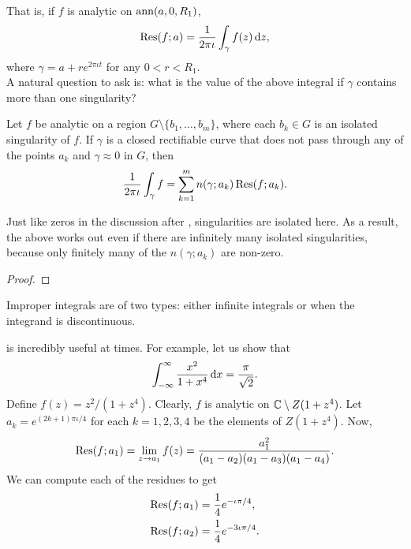 	That is, if $f$ is analytic on $\operatorname{ann}(a,0,R_1)$,
	\[ \Res(f;a) = \frac{1}{2\pi\iota} \int_{\gamma} f(z) \dif z, \]
	where $\gamma = a + re^{2\pi\iota t}$ for any $0 < r < R_1$.\\
	A natural question to ask is: what is the value of the above integral if $\gamma$ contains more than one singularity?

	\begin{ftheo}
		\label{residue theorem}
		Let $f$ be analytic on a region $G \setminus \{b_1,\ldots,b_m\}$, where each $b_k \in G$ is an isolated singularity of $f$. If $\gamma$ is a closed rectifiable curve that does not pass through any of the points $a_k$ and $\gamma \approx 0$ in $G$, then
		\[ \frac{1}{2\pi\iota} \int_{\gamma} f = \sum_{k=1}^m n(\gamma;a_k) \operatorname{Res}(f;a_k). \]
	\end{ftheo}

	Just like zeros in the discussion after , singularities are isolated here. As a result, the above works out even if there are infinitely many isolated singularities, because only finitely many of the $n(\gamma;a_k)$ are non-zero.

	\begin{proof}
		
	\end{proof}

	Improper integrals are of two types: either infinite integrals or when the integrand is discontinuous.

	 is incredibly useful at times. For example, let us show that
	\[ \int_{-\infty}^\infty \frac{x^2}{1+x^4} \dif x = \frac{\pi}{\sqrt{2}}. \]
	Define $f(z) = z^2/(1+z^4)$. Clearly, $f$ is analytic on $\mathbb{C} \setminus Z(1+z^4)$. Let $a_k = e^{(2k+1)\pi\iota/4}$ for each $k = 1,2,3,4$ be the elements of $Z(1+z^4)$. Now,
	\[ \operatorname{Res}(f;a_1) = \lim_{z\to a_1} f(z) = \frac{a_1^2}{(a_1 - a_2)(a_1 - a_3)(a_1 - a_4)}. \]
	We can compute each of the residues to get
	\begin{align*}
		\operatorname{Res}(f;a_1) &= \frac{1}{4} e^{-\iota\pi/4}, \\
		\operatorname{Res}(f;a_2) &= \frac{1}{4} e^{-3\iota\pi/4}.
	\end{align*}

